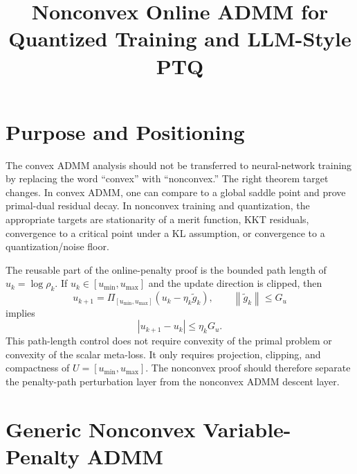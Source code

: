\documentclass[11pt]{article}
\title{Nonconvex Online ADMM for Quantized Training and LLM-Style PTQ}
\author{}
\date{}
\newcommand{\norm}[1]{\left\lVert #1 \right\rVert}
\begin{document}
\maketitle

\section{Purpose and Positioning}

The convex ADMM analysis should not be transferred to neural-network training
by replacing the word ``convex'' with ``nonconvex.''  The right theorem target
changes.  In convex ADMM, one can compare to a global saddle point and prove
primal-dual residual decay.  In nonconvex training and quantization, the
appropriate targets are stationarity of a merit function, KKT residuals,
convergence to a critical point under a KL assumption, or convergence to a
quantization/noise floor.

The reusable part of the online-penalty proof is the bounded path length of
\(u_k=\log\rho_k\).  If \(u_k\in[u_{\min},u_{\max}]\) and the update direction
is clipped, then
\begin{equation}
    u_{k+1}
    =
    \Pi_{[u_{\min},u_{\max}]}
    (u_k-\eta_k\widetilde g_k),
    \qquad
    \norm{\widetilde g_k}\le G_u
\end{equation}
implies
\begin{equation}
    |u_{k+1}-u_k|\le \eta_k G_u.
    \label{eq:path-length}
\end{equation}
This path-length control does not require convexity of the primal problem or
convexity of the scalar meta-loss.  It only requires projection, clipping, and
compactness of \(U=[u_{\min},u_{\max}]\).  The nonconvex proof should therefore
separate the penalty-path perturbation layer from the nonconvex ADMM descent
layer.

\section{Generic Nonconvex Variable-Penalty ADMM}
\end{document}
